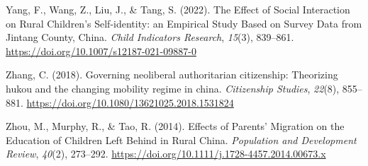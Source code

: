 \documentclass[
  man,floatsintext]{apa7}
\newlength{\cslhangindent}
\newlength{\cslentryspacingunit} %
\newenvironment{CSLReferences}[2] %
 {%
  \setlength{\parindent}{0pt}
  \ifodd #1
  \let\oldpar\par
  \def\par{\hangindent=\cslhangindent\oldpar}
  \fi
  \setlength{\parskip}{#2\cslentryspacingunit}
 }%
 {}
\begin{document}
\begin{CSLReferences}{1}{0}
\leavevmode{}%
Yang, F., Wang, Z., Liu, J., \& Tang, S. (2022). The Effect of Social Interaction on Rural Children{'}s Self-identity: an Empirical Study Based on Survey Data from Jintang County, China. \emph{Child Indicators Research}, \emph{15}(3), 839--861. \url{https://doi.org/10.1007/s12187-021-09887-0}

\leavevmode{}%
Zhang, C. (2018). Governing neoliberal authoritarian citizenship: Theorizing hukou and the changing mobility regime in china. \emph{Citizenship Studies}, \emph{22}(8), 855--881. \url{https://doi.org/10.1080/13621025.2018.1531824}

\leavevmode{}%
Zhou, M., Murphy, R., \& Tao, R. (2014). Effects of Parents' Migration on the Education of Children Left Behind in Rural China. \emph{Population and Development Review}, \emph{40}(2), 273--292. \url{https://doi.org/10.1111/j.1728-4457.2014.00673.x}

\end{CSLReferences}
\end{document}
